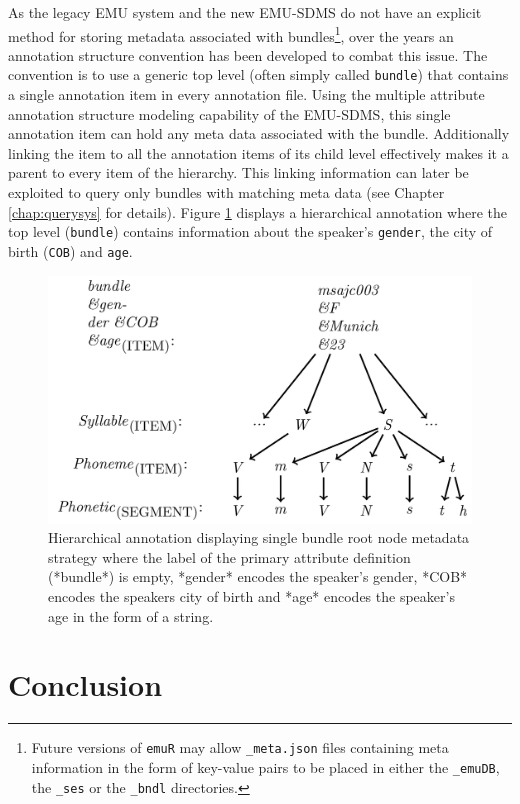 \documentclass[]{book}
\let\rmarkdownfootnote\footnote%
\def\footnote{\protect\rmarkdownfootnote}
\begin{document}
As the legacy EMU system and the new EMU-SDMS do not have an explicit method for storing metadata associated with bundles\footnote{Future versions of \texttt{emuR} may allow \texttt{\_meta.json} files containing meta information in the form of key-value pairs to be placed in either the \texttt{\_emuDB}, the \texttt{\_ses} or the \texttt{\_bndl} directories.}, over the years an annotation structure convention has been developed to combat this issue. The convention is to use a generic top level (often simply called \texttt{bundle}) that contains a single annotation item in every annotation file. Using the multiple attribute annotation structure modeling capability of the EMU-SDMS, this single annotation item can hold any meta data associated with the bundle. Additionally linking the item to all the annotation items of its child level effectively makes it a parent to every item of the hierarchy. This linking information can later be exploited to query only bundles with matching meta data (see Chapter \ref{chap:querysys} for details). Figure \ref{fig:singleBundleRootNode} displays a hierarchical annotation where the top level (\texttt{bundle}) contains information about the speaker's \texttt{gender}, the city of birth (\texttt{COB}) and \texttt{age}.

\begin{figure}

{\centering \includegraphics[width=0.65\linewidth]{pics/singleBundleRootNode} 

}

\caption{Hierarchical annotation displaying single bundle root node metadata strategy where the label of the primary attribute definition (*bundle*) is empty, *gender* encodes the speaker's gender, *COB* encodes the speakers city of birth and *age* encodes the speaker's age in the form of a string.}\label{fig:singleBundleRootNode}
\end{figure}

\hypertarget{conclusion-1}{%
\section{Conclusion}\label{conclusion-1}}
\end{document}
